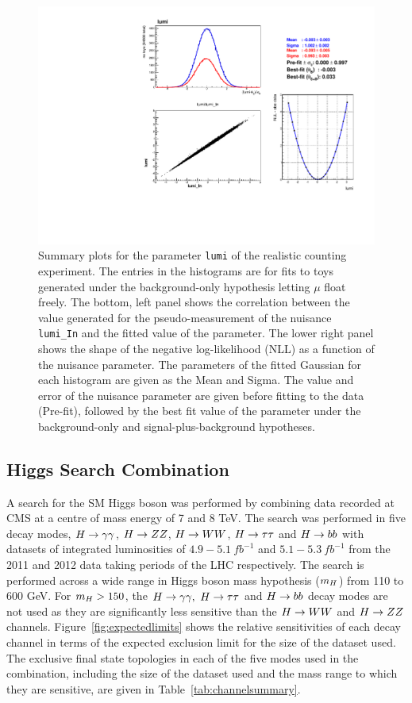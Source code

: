 \begin{figure}
  \begin{center}
    \includegraphics[width=\textwidth]{combinations/diagnostics/tree_fit_sb_lumi.pdf}
    \caption{Summary plots for the parameter \texttt{lumi} of the realistic counting experiment. 
	The entries in the histograms are for fits to toys generated under the background-only
	hypothesis letting $\mu$ float freely. The bottom, left panel shows the correlation
	between the value generated for the pseudo-measurement of the nuisance 
	\texttt{lumi\_In} and the fitted value of the parameter. 
	The lower right panel shows the shape of the 
	negative log-likelihood (NLL) as a function of the nuisance parameter.
	The parameters of the fitted Gaussian for each histogram are given as the
	Mean and Sigma. The value and error of the nuisance parameter are given before fitting
	to the data (Pre-fit), followed by the best fit value of the parameter 
	under the background-only and signal-plus-background hypotheses.}
    \label{fig:real_lumi_s}
  \end{center}
\end{figure}

\subsection{Higgs Search Combination}
\label{combinedsearchresults}

A search for the SM Higgs boson was performed by combining data recorded at CMS 
at a centre of mass energy of 7 and 8 TeV. The search was performed in five
decay modes, $H\rightarrow\gamma\gamma$, $H\rightarrow ZZ$, $H\rightarrow WW$, $H\rightarrow\tau\tau$ and $H\rightarrow bb$ with datasets of
integrated luminosities of $4.9-5.1~fb^{-1}$ and $5.1-5.3~fb^{-1}$
from the 2011 and 2012 data taking periods of the LHC respectively.
The search is performed across a wide range in Higgs boson mass hypothesis ($m_{H}$) 
from 110 to 600 GeV. For $m_{H}>150$, the $H\rightarrow\gamma\gamma,~H\rightarrow\tau\tau$ and $H\rightarrow bb$ decay modes are not used
as they are significantly less sensitive than the $H\rightarrow WW$ and
$H\rightarrow ZZ$ channels. Figure~\ref{fig:expectedlimits} shows the relative sensitivities of 
each decay channel in terms of the expected exclusion limit for the size of the dataset 
used. The exclusive final state topologies in each of the five modes used
in the combination, including the size of the dataset used and the mass range to
which they are sensitive, are given in Table~\ref{tab:channelsummary}.

